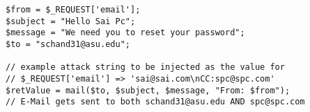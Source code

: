 \begin{lstlisting}
$from = $_REQUEST['email'];
$subject = "Hello Sai Pc";
$message = "We need you to reset your password";
$to = "schand31@asu.edu";

// example attack string to be injected as the value for
// $_REQUEST['email'] => 'sai@sai.com\nCC:spc@spc.com'
$retValue = mail($to, $subject, $message, "From: $from");
// E-Mail gets sent to both schand31@asu.edu AND spc@spc.com
\end{lstlisting}